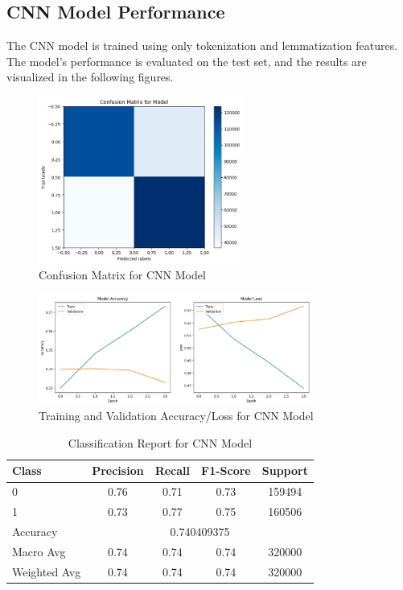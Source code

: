 \documentclass[12pt]{article}
\begin{document}
\subsection{CNN Model Performance}
The CNN model is trained using only tokenization and lemmatization features. The model's performance is evaluated on the test set, and the results are visualized in the following figures.

\begin{figure}[H]
    \centering
    \includegraphics[width=0.6\textwidth]{WhatsApp Image 2024-05-29 at 02.36.54 (1).jpeg}
    \caption{Confusion Matrix for CNN Model}
    \label{fig:cnn_confusion_matrix}
\end{figure}

\begin{figure}[H]
    \centering
    \includegraphics[width=0.8\textwidth]{WhatsApp Image 2024-05-29 at 02.37.14.jpeg}
    \caption{Training and Validation Accuracy/Loss for CNN Model}
    \label{fig:cnn_training_validation}
\end{figure}

\begin{table}[H]
    \centering
    \begin{tabular}{lcccc}
    \hline
    Class & Precision & Recall & F1-Score & Support \\
    \hline
    0 & 0.76 & 0.71 & 0.73 & 159494 \\
    1 & 0.73 & 0.77 & 0.75 & 160506 \\
    \hline
    Accuracy & \multicolumn{4}{c}{0.740409375} \\
    Macro Avg & 0.74 & 0.74 & 0.74 & 320000 \\
    Weighted Avg & 0.74 & 0.74 & 0.74 & 320000 \\
    \hline
    \end{tabular}
    \caption{Classification Report for CNN Model}
    \label{tab:cnn_classification_report}
\end{table}
\end{document}
